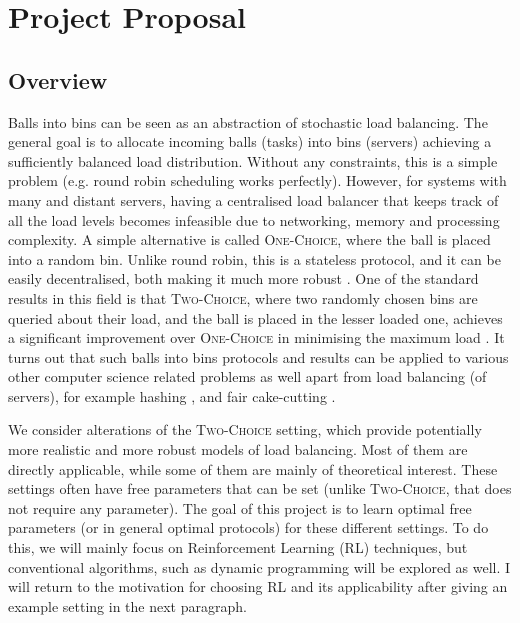 \chapter{Project Proposal}\label{proposal} 

\section*{Overview}

Balls into bins can be seen as an abstraction of stochastic load balancing. The general goal is to allocate incoming balls (tasks) into bins (servers) achieving a sufficiently balanced load distribution. Without any constraints, this is a simple problem (e.g. round robin scheduling works  perfectly). However, for systems with many and distant servers, having a centralised load balancer that keeps track of all the load levels becomes infeasible due to networking, memory and processing complexity.  A simple alternative is called \textsc{One-Choice}, where the ball is placed into a random bin. Unlike round robin, this is a stateless protocol, and it can be easily decentralised, both making it much more robust \cite{nasir2015power}. One of the standard results in this field is that \textsc{Two-Choice}, where two randomly chosen bins are queried about their load, and the ball is placed in the lesser loaded one, achieves a significant improvement over \textsc{One-Choice} in minimising the maximum load \cite{AzarBKU99}. It turns out that such balls into bins protocols and results can be applied to various other computer science related problems as well apart from load balancing (of servers), for example hashing \cite{dahlgaard2016power}, and fair cake-cutting \cite{edmonds2006balanced}.

We consider alterations of the \textsc{Two-Choice} setting, which provide potentially more realistic and more robust models of load balancing. Most of them are directly applicable, while some of them are mainly of theoretical interest. These settings often have free parameters that can be set (unlike \textsc{Two-Choice}, that does not require any parameter). 
The goal of this project is to learn optimal free parameters (or in general optimal protocols) for these different settings. To do this, we will mainly focus on Reinforcement Learning (RL) techniques, but conventional algorithms, such as dynamic programming will be explored as well. I will return to the motivation for choosing RL and its applicability after giving an example setting in the next paragraph.

